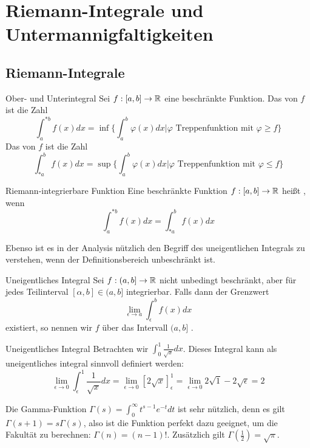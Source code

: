 \newpage
\section[Wiederholung]{Riemann-Integrale und Untermannigfaltigkeiten}
\subsection{Riemann-Integrale}\label{ssec:Riemann-Integrale}
\begin{Def}
{Ober- und Unterintegral}
Sei $f:[a,b]\rightarrow \mathbb{R}$ eine beschränkte Funktion. Das  von $f$ ist die Zahl
$$\int_a^{*b}f(x)dx=\inf \{ \int_a^b \varphi(x)dx | \varphi \text{ Treppenfunktion mit } \varphi\geq f \} $$
Das  von $f$ ist die Zahl
$$\int_{*a}^{b}f(x)dx=\sup \{ \int_a^b \varphi(x)dx | \varphi \text{ Treppenfunktion mit } \varphi\leq f \} $$
\end{Def}

\begin{Def}
{Riemann-integrierbare Funktion}
Eine beschränkte Funktion $f:[a,b]\rightarrow \mathbb{R}$ heißt , wenn $$\int_a^{*b}f(x)dx=\int_{*a}^bf(x)dx$$
\end{Def}
Ebenso ist es in der Analysis nützlich den Begriff des uneigentlichen Integrals zu verstehen, wenn der Definitionsbereich unbeschränkt ist.
\begin{Def}
{Uneigentliches Integral}
Sei $f:(a,b]\rightarrow \mathbb{R}$ nicht unbedingt beschränkt, aber für jedes Teilinterval $[\alpha, b] \in (a,b]$ integrierbar. Falls dann der Grenzwert
$$\lim_{\epsilon\rightarrow a}\int_\epsilon^{b} f(x)dx$$ existiert, so nennen wir $f$ über das Intervall $(a,b]$ .
\end{Def}
\begin{Beispiel}
{Uneigentliches Integral}
Betrachten wir $\int_0^1 \frac{1}{\sqrt{x}}dx$. Dieses Integral kann als uneigentliches integral sinnvoll definiert werden:
$$\lim_{\epsilon\rightarrow 0}\int_\epsilon^1 \frac{1}{\sqrt{x}} dx =\lim_{\epsilon\rightarrow 0} [2\sqrt{x}]_\epsilon^1=\lim_{\epsilon\rightarrow 0}2\sqrt{1}-2\sqrt{\epsilon}=2$$
\end{Beispiel}
Die Gamma-Funktion $\Gamma(s)=\int_0^\infty t^{s-1}e^{-t}dt$ ist sehr nützlich, denn es gilt $\Gamma(s+1)=s\Gamma(s)$, also ist die Funktion perfekt dazu geeignet, um die Fakultät zu berechnen: $\Gamma(n)=(n-1)!$. Zusätzlich gilt $\Gamma(\frac{1}{2})=\sqrt{\pi}$.

